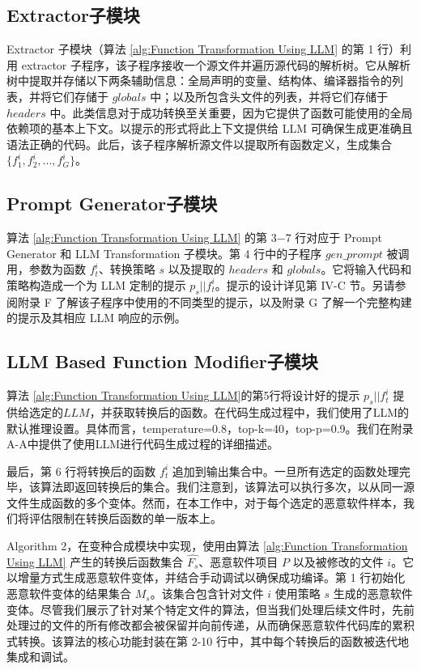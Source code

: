 \subsection{Extractor子模块}
Extractor 子模块（算法 \ref{alg:Function Transformation Using LLM} 的第 1 行）利用 extractor 子程序，该子程序接收一个源文件并遍历源代码的解析树。它从解析树中提取并存储以下两条辅助信息：全局声明的变量、结构体、编译器指令的列表，并将它们存储于 $globals$ 中；以及所包含头文件的列表，并将它们存储于 $headers$ 中。此类信息对于成功转换至关重要，因为它提供了函数可能使用的全局依赖项的基本上下文。以提示的形式将此上下文提供给 LLM 可确保生成更准确且语法正确的代码。此后，该子程序解析源文件以提取所有函数定义，生成集合$\{f_{1}^{i},f_{2}^{i},...,f_{G}^{i}\}$。

\subsection{Prompt Generator子模块}
算法 \ref{alg:Function Transformation Using LLM} 的第 3−7 行对应于 Prompt Generator 和 LLM Transformation 子模块。第 4 行中的子程序 $gen\_prompt$ 被调用，参数为函数 $f_t^{i}$、转换策略 $s$ 以及提取的 $headers$ 和 $globals$。它将输入代码和策略构造成一个为 LLM 定制的提示 $p_{s}||f_{t}^{i}$。提示的设计详见第 IV-C 节。另请参阅附录 F 了解该子程序中使用的不同类型的提示，以及附录 G 了解一个完整构建的提示及其相应 LLM 响应的示例。

\subsection{LLM Based Function Modifier子模块}
算法 \ref{alg:Function Transformation Using LLM}的第5行将设计好的提示 $p_{s}||f_{t}^{i}$ 提供给选定的$LLM$，并获取转换后的函数。在代码生成过程中，我们使用了LLM的默认推理设置。具体而言，temperature=0.8，top-k=40，top-p=0.9。我们在附录A-A中提供了使用LLM进行代码生成过程的详细描述。

最后，第 6 行将转换后的函数 $f_{t}^{i}$ 追加到输出集合中。一旦所有选定的函数处理完毕，该算法即返回转换后的集合。我们注意到，该算法可以执行多次，以从同一源文件生成函数的多个变体。然而，在本工作中，对于每个选定的恶意软件样本，我们将评估限制在转换后函数的单一版本上。

Algorithm 2，在变种合成模块中实现，使用由算法 \ref{alg:Function Transformation Using LLM} 产生的转换后函数集合 $\hat{F_{s}}$、恶意软件项目 $P$ 以及被修改的文件 $i$。它以增量方式生成恶意软件变体，并结合手动调试以确保成功编译。第 1 行初始化恶意软件变体的结果集合 $M_{s}$。该集合包含针对文件 $i$ 使用策略 $s$ 生成的恶意软件变体。尽管我们展示了针对某个特定文件的算法，但当我们处理后续文件时，先前处理过的文件的所有修改都会被保留并向前传递，从而确保恶意软件代码库的累积式转换。该算法的核心功能封装在第 2-10 行中，其中每个转换后的函数被迭代地集成和调试。

